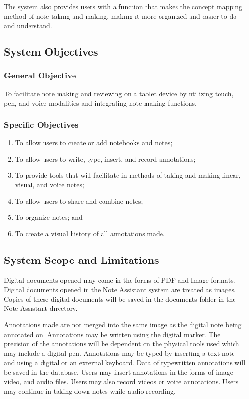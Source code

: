The system also provides users with a function that makes the concept mapping method of note taking and making, making it more organized and easier to do and understand. 

\subsection{System Objectives}
\label{sec:systemobjectives}

\subsubsection{General Objective}
\label{sec:generalobjectives}

To facilitate note making and reviewing on a tablet device by utilizing touch, pen, and voice modalities and integrating note making functions.

\subsubsection{Specific Objectives}
\label{sec:specificobjectives}

\begin{enumerate}
\item To allow users to create or add notebooks and notes;
\item To allow users to write, type, insert, and record annotations;
\item To provide tools that will facilitate in methods of taking and making linear, visual, and voice notes;
\item To allow users to share and combine notes;
\item To organize notes; and
\item To create a visual history of all annotations made.
\end{enumerate}

\subsection{System Scope and Limitations}
\label{sec:systemscopeandlimitations}

Digital documents opened may come in the forms of PDF and Image formats. Digital documents opened in the Note Assistant system are treated as images. Copies of these digital documents will be saved in the documents folder in the Note Assistant directory.

Annotations made are not merged into the same image as the digital note being annotated on. Annotations may be written using the digital marker. The precision of the annotations will be dependent on the physical tools used which may include a digital pen. Annotations may be typed by inserting a text note and using a digital or an external keyboard. Data of typewritten annotations will be saved in the database. Users may insert annotations in the forms of image, video, and audio files. Users may also record videos or voice annotations. Users may continue in taking down notes while audio recording.

